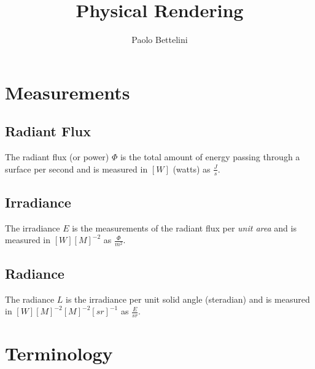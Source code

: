 \documentclass{article}
\title{Physical Rendering}
\author{Paolo Bettelini}
\date{}
\begin{document}
\maketitle
\tableofcontents
\pagebreak

\section{Measurements}

\subsection{Radiant Flux}

The radiant flux (or power) \(\Phi\) is the total amount of energy passing
through a surface per second and is measured in \([W]\) (watts) as \(\frac{J}{s}\).

\subsection{Irradiance}

The irradiance \(E\) is the measurements of the radiant flux per \textit{unit area}
and is measured in \([W]{[M]}^{-2}\) as \(\frac{\Phi}{m^2}\).

\subsection{Radiance}

The radiance \(L\) is the irradiance per unit solid angle (steradian) and is
measured in \([W]{[M]}^{-2}{[M]}^{-2}{[sr]}^{-1}\) as \(\frac{E}{sr}\).

\section{Terminology}

\begin{center}
\end{center}
\end{document}
